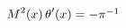 ${\mathop{M\/}\nolimits^{2}}\!\left(x\right)\mathop{\theta\/}\nolimits'\!\left(%
x\right)=-\pi^{-1}$